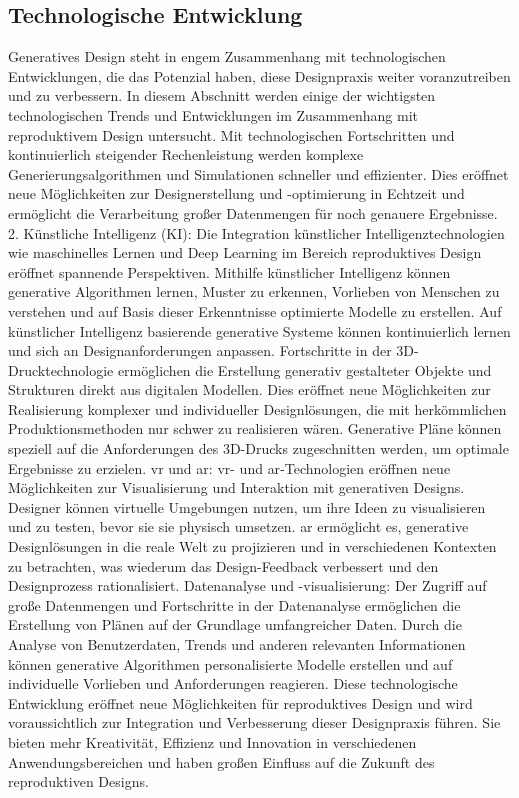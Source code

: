 \subsection*{Technologische Entwicklung}
 Generatives Design steht in engem Zusammenhang mit technologischen Entwicklungen, die das Potenzial haben, diese Designpraxis weiter voranzutreiben und zu verbessern. In diesem Abschnitt werden einige der wichtigsten technologischen Trends und Entwicklungen im Zusammenhang mit reproduktivem Design untersucht. 
 Mit  technologischen Fortschritten und kontinuierlich steigender Rechenleistung werden komplexe Generierungsalgorithmen und Simulationen schneller und effizienter. Dies eröffnet neue Möglichkeiten zur Designerstellung und -optimierung in Echtzeit und ermöglicht die Verarbeitung großer Datenmengen für noch genauere Ergebnisse.  2. Künstliche Intelligenz (KI): Die Integration künstlicher Intelligenztechnologien wie maschinelles Lernen und Deep Learning im Bereich reproduktives Design eröffnet spannende Perspektiven. Mithilfe künstlicher Intelligenz können generative Algorithmen lernen, Muster zu erkennen, Vorlieben von Menschen zu verstehen und auf Basis dieser Erkenntnisse optimierte Modelle zu erstellen. Auf künstlicher Intelligenz basierende generative Systeme können kontinuierlich lernen und sich an Designanforderungen anpassen. 
 Fortschritte in der 3D-Drucktechnologie ermöglichen die Erstellung generativ gestalteter Objekte und Strukturen direkt aus digitalen Modellen. Dies eröffnet neue Möglichkeiten zur Realisierung komplexer und individueller Designlösungen, die mit herkömmlichen Produktionsmethoden nur schwer zu realisieren wären. Generative Pläne können speziell auf die Anforderungen des 3D-Drucks zugeschnitten werden, um optimale Ergebnisse zu erzielen.  
 \ac*{vr} und \ac*{ar}: \ac*{vr}- und \ac*{ar}-Technologien eröffnen neue Möglichkeiten zur Visualisierung und Interaktion mit generativen Designs. Designer können virtuelle Umgebungen nutzen, um ihre Ideen zu visualisieren und zu testen,  bevor sie sie physisch umsetzen. \ac*{ar} ermöglicht es, generative Designlösungen in die reale Welt zu projizieren und  in verschiedenen Kontexten zu betrachten, was wiederum das Design-Feedback verbessert und den Designprozess rationalisiert. 
 Datenanalyse und -visualisierung: Der Zugriff auf große Datenmengen und  Fortschritte in der Datenanalyse ermöglichen die Erstellung von Plänen auf der Grundlage umfangreicher Daten. Durch die Analyse von Benutzerdaten, Trends und anderen relevanten Informationen können generative Algorithmen personalisierte Modelle erstellen und auf individuelle Vorlieben und Anforderungen reagieren.  Diese technologische Entwicklung eröffnet neue Möglichkeiten für reproduktives Design und wird voraussichtlich zur Integration und Verbesserung dieser Designpraxis führen. Sie bieten mehr Kreativität, Effizienz und Innovation in verschiedenen Anwendungsbereichen und haben großen Einfluss auf die Zukunft des reproduktiven Designs.

